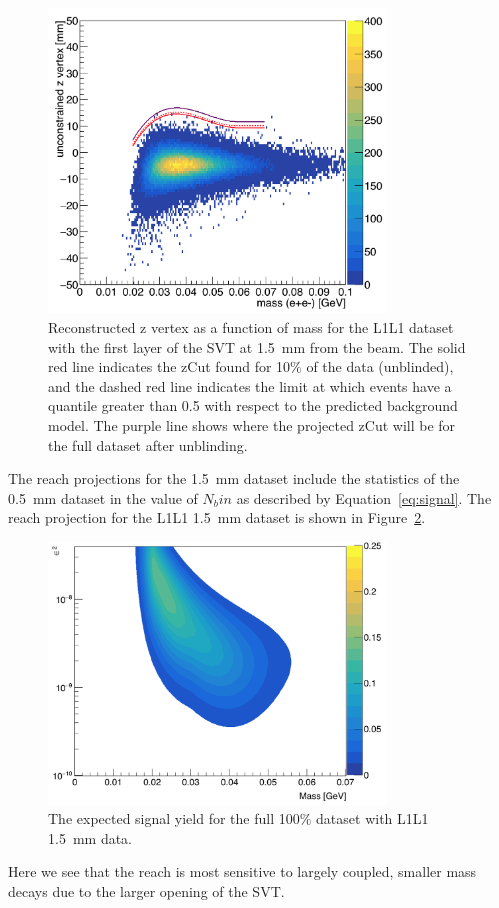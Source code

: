 \begin{figure}[H]
  \centering
     \includegraphics[width=0.8\textwidth]{plots/zVm_L1L1_1p5.png}
  \caption{Reconstructed z vertex as a function of mass for the L1L1 dataset with the first layer of the SVT at 1.5~mm from the beam. The solid red line indicates the zCut found for 10$\%$ of the data (unblinded), and the dashed red line indicates the limit at which events have a quantile greater than 0.5 with respect to the predicted background model. The purple line shows where the projected zCut will be for the full dataset after unblinding.}
  \label{fig:zVm_L1L1_1p5}
\end{figure} 

The reach projections for the 1.5~mm dataset include the statistics of the 0.5~mm dataset in the value of $N_bin$ as described by Equation~\ref{eq:signal}. The reach projection for the L1L1 1.5~mm dataset is shown in Figure~\ref{fig:reach1p5}.

\begin{figure}[H]
  \centering
     \includegraphics[width=0.8\textwidth]{plots/reachL1L1_1p5.png}
  \caption{The expected signal yield for the full 100$\%$ dataset with L1L1 1.5~mm data.}
  \label{fig:reach1p5}
\end{figure} 

Here we see that the reach is most sensitive to largely coupled, smaller mass decays due to the larger opening of the SVT. 
